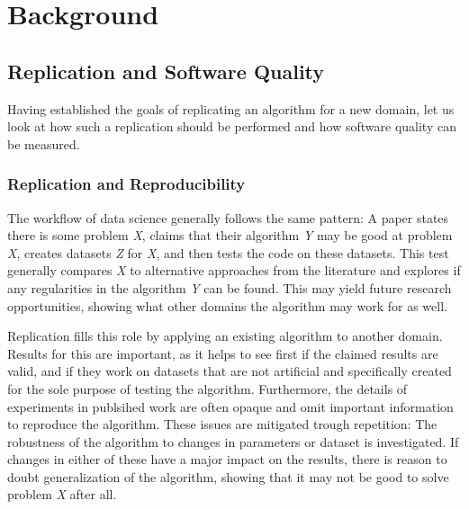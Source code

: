 \chapter{Background}


\section{Replication and Software Quality}

Having established the goals of replicating an algorithm for a new domain, let us look at how such a replication should be performed and how software quality can be measured.

\subsection{Replication and Reproducibility}
\label{sec:howtoreplicate}

The workflow of data science generally follows the same pattern: A paper states there is some problem \textit{X}, claims that their algorithm \textit{Y} may be good at problem \textit{X}, creates datasets \textit{Z} for \textit{X}, and then tests the code on these datasets. This test generally compares \textit{X} to alternative approaches from the literature and explores if any regularities in the algorithm \textit{Y} can be found. This may yield future research opportunities, showing what other domains the algorithm may work for as well.

Replication fills this role by applying an existing algorithm to another domain. Results for this are important, as it helps to see first if the claimed results are valid, and if they work on datasets that are not artificial and specifically created for the sole purpose of testing the algorithm. Furthermore, the details of experiments in publsihed work are often opaque and omit important information to reproduce the algorithm. These issues are mitigated trough repetition: The robustness of the algorithm to changes in parameters or dataset is investigated. If changes in either of these have a major impact on the results, there is reason to doubt generalization of the algorithm, showing that it may not be good to solve problem \textit{X} after all.

